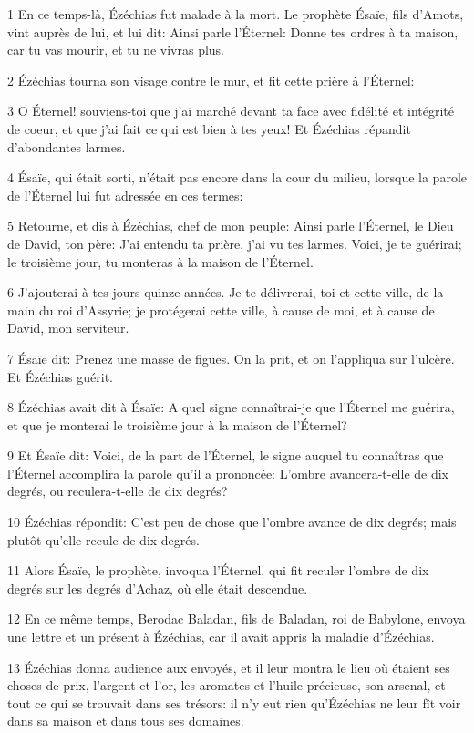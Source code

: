 \par 1 En ce temps-là, Ézéchias fut malade à la mort. Le prophète Ésaïe, fils d'Amots, vint auprès de lui, et lui dit: Ainsi parle l'Éternel: Donne tes ordres à ta maison, car tu vas mourir, et tu ne vivras plus.
\par 2 Ézéchias tourna son visage contre le mur, et fit cette prière à l'Éternel:
\par 3 O Éternel! souviens-toi que j'ai marché devant ta face avec fidélité et intégrité de coeur, et que j'ai fait ce qui est bien à tes yeux! Et Ézéchias répandit d'abondantes larmes.
\par 4 Ésaïe, qui était sorti, n'était pas encore dans la cour du milieu, lorsque la parole de l'Éternel lui fut adressée en ces termes:
\par 5 Retourne, et dis à Ézéchias, chef de mon peuple: Ainsi parle l'Éternel, le Dieu de David, ton père: J'ai entendu ta prière, j'ai vu tes larmes. Voici, je te guérirai; le troisième jour, tu monteras à la maison de l'Éternel.
\par 6 J'ajouterai à tes jours quinze années. Je te délivrerai, toi et cette ville, de la main du roi d'Assyrie; je protégerai cette ville, à cause de moi, et à cause de David, mon serviteur.
\par 7 Ésaïe dit: Prenez une masse de figues. On la prit, et on l'appliqua sur l'ulcère. Et Ézéchias guérit.
\par 8 Ézéchias avait dit à Ésaïe: A quel signe connaîtrai-je que l'Éternel me guérira, et que je monterai le troisième jour à la maison de l'Éternel?
\par 9 Et Ésaïe dit: Voici, de la part de l'Éternel, le signe auquel tu connaîtras que l'Éternel accomplira la parole qu'il a prononcée: L'ombre avancera-t-elle de dix degrés, ou reculera-t-elle de dix degrés?
\par 10 Ézéchias répondit: C'est peu de chose que l'ombre avance de dix degrés; mais plutôt qu'elle recule de dix degrés.
\par 11 Alors Ésaïe, le prophète, invoqua l'Éternel, qui fit reculer l'ombre de dix degrés sur les degrés d'Achaz, où elle était descendue.
\par 12 En ce même temps, Berodac Baladan, fils de Baladan, roi de Babylone, envoya une lettre et un présent à Ézéchias, car il avait appris la maladie d'Ézéchias.
\par 13 Ézéchias donna audience aux envoyés, et il leur montra le lieu où étaient ses choses de prix, l'argent et l'or, les aromates et l'huile précieuse, son arsenal, et tout ce qui se trouvait dans ses trésors: il n'y eut rien qu'Ézéchias ne leur fît voir dans sa maison et dans tous ses domaines.
